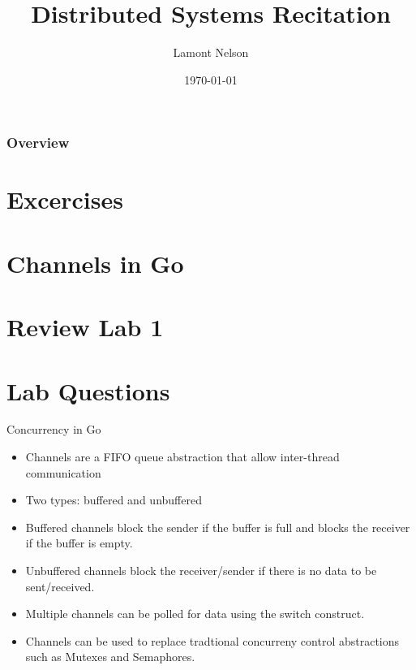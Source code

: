 \documentclass[svgnames]{beamer}
\title[Distributed Systems Recitation]{Distributed Systems Recitation} %
\author{Lamont Nelson} %
\institute[NYU] %
{
New York University \\ %
\medskip
\textit{lamont.nelson@nyu.edu} %
}
\date{\today} %
\begin{document}
\begin{frame}
\titlepage %
\end{frame}

\begin{frame}
	\frametitle{Overview} %
	\tableofcontents %
\end{frame}

\section{Excercises}
\section{Channels in Go}
\section{Review Lab 1}
\section{Lab Questions}

\begin{frame}{Concurrency in Go}
\begin{itemize}
	\item Channels are a FIFO queue abstraction that allow inter-thread communication
	\item Two types: buffered and unbuffered
	\item Buffered channels block the sender if the buffer is full and blocks the receiver if the buffer is empty.
	\item Unbuffered channels block the receiver/sender if there is no data to be sent/received.
	\item Multiple channels can be polled for data using the switch construct.
	\item Channels can be used to replace tradtional concurreny control abstractions such as Mutexes and Semaphores.
\end{itemize}
\end{frame}
\end{document}
